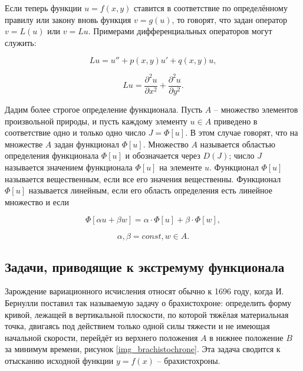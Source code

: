 Если теперь функции $u = f(x, y)$ ставится в соответствие по определённому правилу или закону вновь функция $v = g(u)$, то говорят, что задан оператор $v = L(u)$ или $v = Lu$. Примерами дифференциальных операторов могут служить:

\begin{displaymath}
	Lu = u'' + p(x,y)u' + q(x,y)u,
\end{displaymath}

\begin{displaymath}
    Lu = \frac{\partial^2 u}{\partial x^2} + \frac{\partial^2 u}{\partial y^2}.
\end{displaymath}

Дадим более строгое определение функционала. Пусть $A$ -- множество элементов произвольной природы, и пусть каждому элементу $u \in A$ приведено в соответствие одно и только одно число $J = \Phi[u]$. В этом случае говорят, что на множестве $A$ задан функционал $\Phi[u]$. Множество $A$ называется областью определения функционала $\Phi[u]$ и обозначается через $D(J)$; число $J$ называется значением функционала $\Phi[u]$ на элементе $u$. Функционал $\Phi[u]$ называется вещественным, если все его значения вещественны. Функционал $\Phi[u]$ называется линейным, если его область определения есть линейное множество и если

\begin{displaymath}
    \Phi[\alpha u + \beta w] = \alpha \cdot \Phi[u] + \beta \cdot \Phi[w],
\end{displaymath}

\begin{displaymath}
	\alpha, \beta = const, w \in A.
\end{displaymath}


\subsection{Задачи, приводящие к экстремуму функционала}

Зарождение вариационного исчисления относят обычно к 1696 году, когда И. Бернулли поставил так называемую задачу о брахистохроне: определить форму кривой, лежащей в вертикальной плоскости, по которой тяжёлая материальная точка, двигаясь под действием только одной силы тяжести и не имеющая начальной скорости, перейдёт из верхнего положения $A$ в нижнее положение $B$ за минимум времени, рисунок \ref{img_brachistochrone}. Эта задача сводится к отысканию исходной функции $y = f(x)$ -- брахистохроны.


